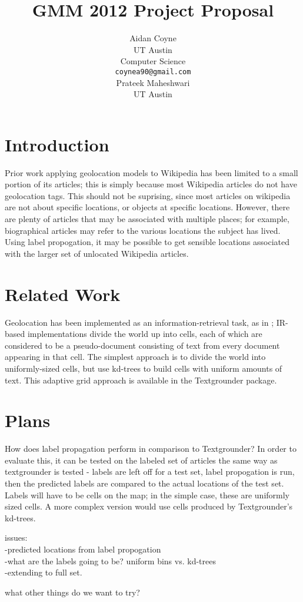 \documentclass[11pt]{article}
\title{GMM 2012 Project Proposal}
\author{Aidan Coyne \\
    UT Austin\\
    Computer Science\\
  {\tt coynea90@gmail.com} \\ 
  \And
  Prateek Maheshwari\\
  UT Austin\\} %
\date{}
\begin{document}
\maketitle

\section{Introduction}
Prior work applying geolocation models to Wikipedia has been limited to a small portion of its articles;
this is simply because most Wikipedia articles do not have geolocation tags.
This should not be suprising, since most articles on wikipedia are not about specific locations, or objects at specific locations.
However, there are plenty of articles that may be associated with multiple places; for example, biographical articles may refer to the various locations the subject has lived.
Using label propogation, it may be possible to get sensible locations associated with the larger set of unlocated Wikipedia articles.

\section{Related Work}
Geolocation has been implemented as an information-retrieval task, as in
\cite{skiles:12}; IR-based implementations divide the world up into cells, each
of which are considered to be a pseudo-document consisting of text from every
document appearing in that cell.
The simplest approach is to divide the world into uniformly-sized cells, but
\cite{rolleretal:12} use kd-trees to build cells with uniform amounts of text.
This adaptive grid approach is available in the Textgrounder package.

\par
\cite{talukdar:09} \cite{talukdar:10}

\section{Plans}
\par %
How does label propagation perform in comparison to Textgrounder?
In order to evaluate this, it can be tested on the labeled set of articles the same way as textgrounder is tested -
labels are left off for a test set, label propogation is run, then the predicted labels are compared to the actual locations of the test set.
Labels will have to be cells on the map; in the simple case, these are uniformly sized cells.
A more complex version would use cells produced by Textgrounder's kd-trees.

\par issues:\\
-predicted locations from label propogation\\
-what are the labels going to be? uniform bins vs. kd-trees\\
-extending to full set.


what other things do we want to try?



\end{document}
